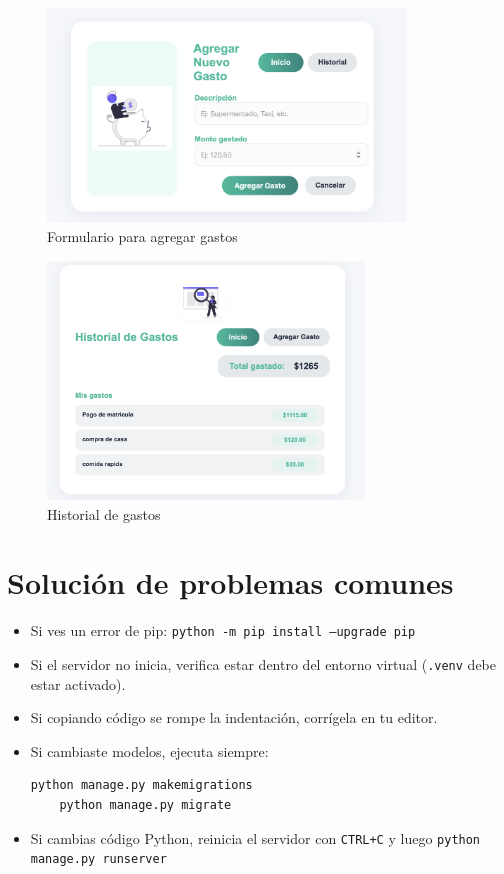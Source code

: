 \documentclass[12pt,a4paper]{article}
\begin{document}
\begin{figure}[H]
    \centering
    \includegraphics[width=0.85\textwidth]{Imagenes/Formulario.png}
    \caption{Formulario para agregar gastos}
\end{figure}

\begin{figure}[H]
    \centering
    \includegraphics[width=0.75\textwidth]{Imagenes/Historial de gastos.png}
    \caption{Historial de gastos}
\end{figure}

\section{Solución de problemas comunes}
\begin{itemize}
    \item Si ves un error de pip: \texttt{python -m pip install --upgrade pip}
    \item Si el servidor no inicia, verifica estar dentro del entorno virtual (\texttt{.venv} debe estar activado).
    \item Si copiando código se rompe la indentación, corrígela en tu editor.
    \item Si cambiaste modelos, ejecuta siempre:
    \begin{lstlisting}[language=bash]
    python manage.py makemigrations
    python manage.py migrate
    \end{lstlisting}
    \item Si cambias código Python, reinicia el servidor con \texttt{CTRL+C} y luego \texttt{python manage.py runserver}
\end{itemize}
\end{document}
